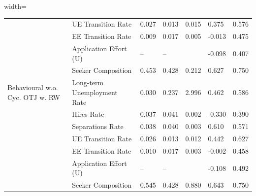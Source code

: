 \begin{adjustbox}{width=\textwidth}
\begin{tabular}{lllllll}
\cellcolor{modelBehaviouralwCycOTJwRW!25} & UE Transition Rate & 0.027 & 0.013 & 0.015 & \cellcolor{green!40!yellow!25}0.375 & 0.576 \\
\cellcolor{modelBehaviouralwCycOTJwRW!25} & EE Transition Rate & 0.009 & 0.017 & 0.005 & \cellcolor{yellow!25}-0.013 & 0.475 \\
\cellcolor{modelBehaviouralwCycOTJwRW!25} & Application Effort (U) & -- & -- &  & \cellcolor{green!40!yellow!25}-0.098 & 0.407 \\
\cellcolor{modelBehaviouralwCycOTJwRW!25} & Seeker Composition & 0.453 & 0.428 & 0.212 & \cellcolor{yellow!25}0.627 & 0.750 \\
\cellcolor{modelBehaviouralwoCycOTJwRW!25}Behavioural w.o. Cyc. OTJ w. RW & Long-term Unemployment Rate & 0.030 & 0.237 & 2.996 & \cellcolor{green!40!yellow!25}0.462 & 0.586 \\
\cellcolor{modelBehaviouralwoCycOTJwRW!25} & Hires Rate & 0.037 & 0.041 & 0.002 & \cellcolor{green!40!yellow!25}-0.330 & 0.390 \\
\cellcolor{modelBehaviouralwoCycOTJwRW!25} & Separations Rate & 0.038 & 0.040 & 0.003 & \cellcolor{green!40!yellow!25}0.610 & 0.571 \\
\cellcolor{modelBehaviouralwoCycOTJwRW!25} & UE Transition Rate & 0.026 & 0.013 & 0.012 & \cellcolor{green!70!yellow!25}0.442 & 0.627 \\
\cellcolor{modelBehaviouralwoCycOTJwRW!25} & EE Transition Rate & 0.010 & 0.017 & 0.003 & \cellcolor{green!40!yellow!25}-0.002 & 0.458 \\
\cellcolor{modelBehaviouralwoCycOTJwRW!25} & Application Effort (U) & -- & -- &  & \cellcolor{orange!25}-0.108 & 0.492 \\
\cellcolor{modelBehaviouralwoCycOTJwRW!25} & Seeker Composition & 0.545 & 0.428 & 0.880 & \cellcolor{green!70!yellow!25}0.643 & 0.750 \\
\bottomrule
\end{tabular}
\end{adjustbox}
